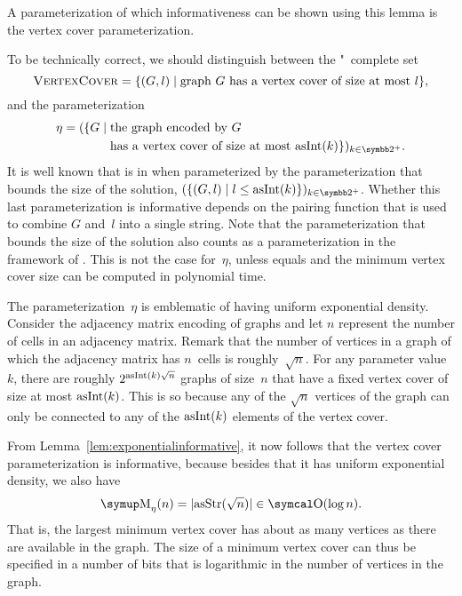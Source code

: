 A parameterization of which informativeness can be shown using this lemma is the vertex cover parameterization.
\begin{example}
\label{ex:vc_informative}%
  To be technically correct, we should distinguish between the "~complete \parencite{garey1979computers} set
  \begin{equation*}
    \defkeyat{VertexCover@\pr{VertexCover}}{\pr{VertexCover}} \deq \{(G, l) \st \text{graph $G$ has a vertex cover of size at most $l$}\},
  \end{equation*}
  and the parameterization
  \begin{align*}
    \eta \deq (\{G \st &\text{the graph encoded by $G$} \\
    	&\text{has a vertex cover of size at most $\asNat(k)$}\})_{k \in \binary^+}.
  \end{align*}
  It is well known that  is in  when parameterized by the parameterization that bounds the size of the solution, $(\{(G, l) \st l \le \asNat(k)\})_{k \in \binary^+}$.
  Whether this last parameterization is informative depends on the pairing function that is used to combine $G$ and~$l$ into a single string.
  Note that the parameterization that bounds the size of the solution also counts as a parameterization in the framework of \citeauthor{flum2006parameterized}.
  This is not the case for~$\eta$, unless  equals  and the minimum vertex cover size can be computed in polynomial time.

  The parameterization~$\eta$ is emblematic of having uniform exponential density.
  Consider the adjacency matrix encoding of graphs and let $n$ represent the number of cells in an adjacency matrix.
  Remark that the number of vertices in a graph of which the adjacency matrix has $n$~cells is roughly~$\sqrt{n}$.
  For any parameter value~$k$, there are roughly $2^{\operatorname{asInt}(k)\sqrt{n}}$ graphs of size~$n$ that have a fixed vertex cover of size at most $\operatorname{asInt}(k)$.
  This is so because any of the $\sqrt{n}$ vertices of the graph can only be connected to any of the $\operatorname{asInt}(k)$ elements of the vertex cover.

  From Lemma~\ref{lem:exponentialinformative}, it now follows that the vertex cover parameterization is informative, because besides that it has uniform exponential density, we also have
  \begin{equation*}
    \upM_\eta(n) = \length{\asStr(\sqrt{n})} \in \bigO(\log n).
  \end{equation*}
  That is, the largest minimum vertex cover has about as many vertices as there are available in the graph.
  The size of a minimum vertex cover can thus be specified in a number of bits that is logarithmic in the number of vertices in the graph.
\end{example}


